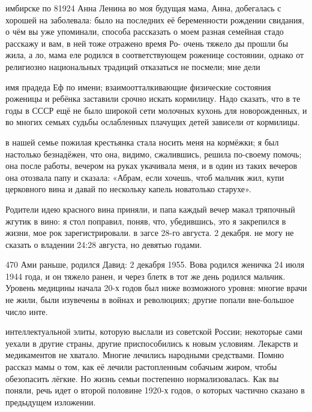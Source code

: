 \label{141-1}
имбирске по 81924 Анна Ленина во моя будущая мама, Анна, добегалась с хорошей на заболевала: было на последних её беременности рождении свидания, о чём вы уже упоминали, способа рассказать о моем разная семейная стадо расскажу и вам, в ней тоже отражено время Ро- очень тяжело ды прошли бы жила, а ло, мама еле родился в соответствующем роженице состоянии, однако от религиозно национальных традиций отказаться не посмели; мне дели

\label{142-1}
имя прадеда
Еф по имени; взаимоотталкивающие физические состояния роженицы и ребёнка заставили срочно искать кормилицу. Надо сказать, что в те годы в СССР ещё не было широкой сети молочных кухонь для новорожденных, и во многих семьях судьбы ослабленных плачущих детей зависели от кормилицы.

\label{143-1}
в нашей семье пожилая крестьянка стала носить меня на кормёжки; я был настолько безнадёжен, что она, видимо, сжалившись, решила по-своему помочь; она после работы, вечером на руках укачивала меня, и в один из таких вечеров она отозвала папу и сказала: «Абрам, если хочешь, чтоб мальчик жил, купи церковного вина и давай по нескольку капель новатолько старухе».

\label{144-1}
Родители идею красного вина приняли, и папа каждый вечер макал тряпочный жгутик в вино: я стол поправил, поняв, что, убедившись, это я закрепился в жизни, мое рок зарегистрировали. в загсе 28-го августа. 2 декабря. не могу не сказать о владении 24:28 августа, но девятью годами.

\label{145-1}
470
Ами раньше, родился Давид: 2 декабря 1955. Вова родился женичка 24 июля 1944 года, и он тяжело ранен, и через блетк в тот же день родился мальчик.
Уровень медицины начала 20-х годов был ниже возможного уровня: многие врачи не жили, были изувечены в войнах и революциях; другие попали вне-большое число инте.

\label{146-1}
интеллектуальной элиты, которую выслали из советской России; некоторые сами уехали в другие страны, другие приспособились к новым условиям. Лекарств и медикаментов не хватало. Многие лечились народными средствами. Помню рассказ мамы о том, как её лечили растопленным собачьим жиром, чтобы обезопасить лёгкие. Но жизнь семьи постепенно нормализовалась. Как вы поняли, речь идет о второй половине 1920-х годов, о которых частично сказано в предыдущем изложении.
